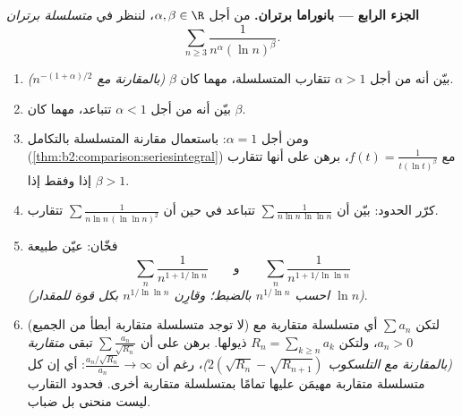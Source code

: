 \begin{problem}[{مسألة نهاية الأسبوع --- $\zeta(2) = \pi^2/6$ وبانوراما
برتران}]
\medskip
\noindent\textbf{الجزء الرابع --- بانوراما برتران.} من أجل $\alpha,
\beta \in \R$، لننظر في \emph{متسلسلة برتران}
\[
\sum_{n \geq 3} \frac{1}{n^{\alpha}(\ln n)^{\beta}} .
\]
\begin{enumerate}[resume]
  \item بيّن أنه من أجل $\alpha > 1$ تتقارب المتسلسلة،
        مهما كان $\beta$ \emph{(بالمقارنة مع
        $n^{-(1+\alpha)/2}$)}.
  \item بيّن أنه من أجل $\alpha < 1$ تتباعد، مهما كان
        $\beta$.
  \item ومن أجل $\alpha = 1$: باستعمال مقارنة المتسلسلة بالتكامل
        (\cref{thm:b2:comparison:seriesintegral}) مع $f(t) =
        \frac{1}{t(\ln t)^\beta}$، برهن على أنها تتقارب إذا وفقط إذا $\beta
        > 1$.
  \item كرّر الحدود: بيّن أن $\sum\frac{1}{n\ln n\,\ln\ln
        n}$ تتباعد في حين أن $\sum\frac{1}{n\ln n\,(\ln\ln n)^2}$
        تتقارب.
  \item فخّان: عيّن طبيعة
        \[
        \sum_n \frac{1}{n^{1 + 1/\ln n}}
        \qquad\text{و}\qquad
        \sum_n \frac{1}{n^{1 + 1/\ln\ln n}}
        \]
        \emph{(احسب $n^{1/\ln n}$ بالضبط؛ وقارِن
        $n^{1/\ln\ln n}$ بكل قوة للمقدار $\ln n$)}.
  \item (لا توجد متسلسلة متقاربة أبطأ من الجميع) لتكن $\sum a_n$ أي
        متسلسلة متقاربة مع $a_n > 0$، ولتكن $R_n = \sum_{k
        \geq n}a_k$ ذيولها. برهن على أن $\sum
        \frac{a_n}{\sqrt{R_n}}$ تبقى \emph{متقاربة}
        \emph{(بالمقارنة مع التلسكوب $2(\sqrt{R_n} -
        \sqrt{R_{n+1}})$)}، رغم أن $\frac{a_n/\sqrt{R_n}}{a_n}
        \to \infty$: أي إن كل متسلسلة متقاربة مهيمَن عليها تمامًا
        بمتسلسلة متقاربة أخرى. فحدود التقارب
        ليست منحنى بل ضباب.
\end{enumerate}


\end{problem}
